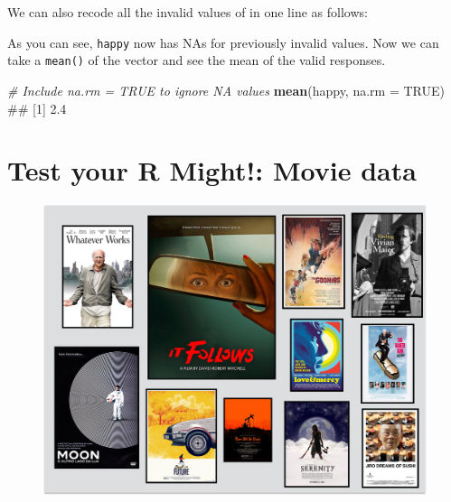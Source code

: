 \documentclass[]{book}
\newenvironment{Shaded}{\begin{snugshade}}{\end{snugshade}}
\newcommand{\KeywordTok}[1]{\textcolor[rgb]{0.13,0.29,0.53}{\textbf{{#1}}}}
\newcommand{\DataTypeTok}[1]{\textcolor[rgb]{0.13,0.29,0.53}{{#1}}}
\newcommand{\DecValTok}[1]{\textcolor[rgb]{0.00,0.00,0.81}{{#1}}}
\newcommand{\StringTok}[1]{\textcolor[rgb]{0.31,0.60,0.02}{{#1}}}
\newcommand{\CommentTok}[1]{\textcolor[rgb]{0.56,0.35,0.01}{\textit{{#1}}}}
\newcommand{\OtherTok}[1]{\textcolor[rgb]{0.56,0.35,0.01}{{#1}}}
\newcommand{\NormalTok}[1]{{#1}}
\theoremstyle{definition}
\theoremstyle{definition}
\theoremstyle{remark}
\begin{document}
We can also recode all the invalid values of  in one line
as follows:

\begin{Shaded}
\end{Shaded}

As you can see, \texttt{happy} now has NAs for previously invalid
values. Now we can take a \texttt{mean()} of the vector and see the mean
of the valid responses.

\begin{Shaded}
\begin{Highlighting}[]
\CommentTok{# Include na.rm = TRUE to ignore NA values}
\KeywordTok{mean}\NormalTok{(happy, }\DataTypeTok{na.rm =} \OtherTok{TRUE}\NormalTok{)}
\NormalTok{## [1] 2.4}
\end{Highlighting}
\end{Shaded}

\section{Test your R Might!: Movie
data}\label{test-your-r-might-movie-data}

\begin{figure}

{\centering \includegraphics[width=600px]{images/moviecollage} 

}

\end{figure}
\end{document}
